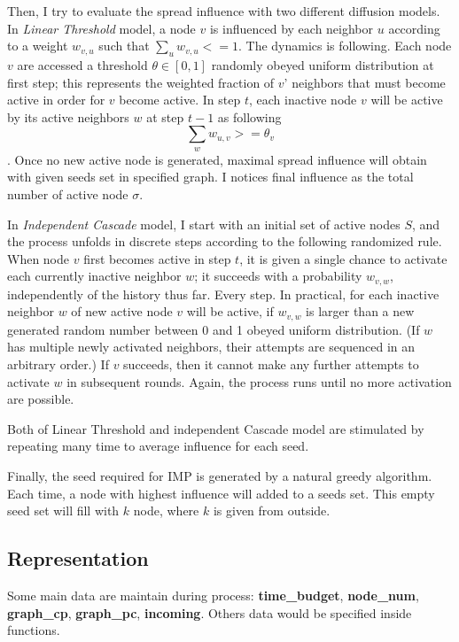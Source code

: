 \documentclass[conference,compsoc]{IEEEtran}
\begin{document}
Then, I try to evaluate the spread influence with two different diffusion
models. In \textit{Linear Threshold} model, a node $v$ is influenced by each
neighbor $u$ according to a weight $w_{v,u}$ such that $\sum_{u}{w_{v,u}}
<=1$. The dynamics is following. Each node $v$ are accessed a threshold $\theta\in
[0,1]$ randomly obeyed uniform distribution at first step; this represents
the weighted fraction of $v$' neighbors that must become active in order
for $v$ become active. In step $t$, each inactive node $v$ will be active
by its active neighbors $w$ at step $t-1$ as following
$$\sum_{w}{w_{u,v}} >= \theta_v$$. Once no new active node is generated,
maximal spread influence will obtain with given seeds set in specified graph.
I notices final influence as the total number of active node $\sigma$.

In \textit{Independent Cascade} model, I start with an initial set of active
nodes $S$, and the process unfolds in discrete steps according to the following
randomized rule. When node $v$ first becomes active in step $t$, it is given
a single chance to activate each currently inactive neighbor $w$; it succeeds
with a probability $w_{v,w}$, independently of the history thus far. Every
step. In practical, for each inactive neighbor $w$ of new active node $v$ will
be active, if $w_{v,w}$ is larger than a new generated random number between 0 and
1 obeyed uniform distribution. (If $w$ has multiple newly activated neighbors,
their attempts are sequenced in an arbitrary order.) If $v$ succeeds, then it
cannot make any further attempts to activate $w$ in subsequent rounds. Again,
the process runs until no more activation are possible.

Both of Linear Threshold and independent Cascade model are stimulated by
repeating many time to average influence for each seed.

Finally, the seed required for IMP is generated by a natural greedy algorithm.
Each time, a node with highest influence will added to a seeds set. This empty
seed set will fill with $k$ node, where $k$ is given from outside.

\subsection{Representation}
Some main data are maintain during process: \textbf{time\_budget},
\textbf{node\_num}, \textbf{graph\_cp}, \textbf{graph\_pc}, \textbf{incoming}.
Others data would be specified inside functions.
\end{document}
